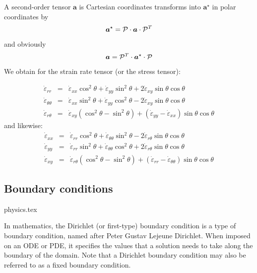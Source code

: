 A second-order tensor ${\bm a}$ is Cartesian coordinates transforms into ${\bm a}^\star$
in polar coordinates by 
\[
{\bm a}^\star = {\cal P} \cdot {\bm a} \cdot {\cal P}^T
\]
and obviously 
\[
{\bm a} = {\cal P}^T \cdot {\bm a}^\star \cdot {\cal P}
\]
We obtain for the strain rate tensor (or the stress tensor):

\begin{eqnarray}
\dot{\varepsilon}_{rr} 
&=& \dot{\varepsilon}_{xx} \cos^2\theta + \dot{\varepsilon}_{yy} \sin^2\theta 
+ 2 \dot{\varepsilon}_{xy} \sin\theta\cos\theta \\
\dot{\varepsilon}_{\theta\theta}
&=& \dot{\varepsilon}_{xx} \sin^2\theta + \dot{\varepsilon}_{yy} \cos^2\theta 
- 2 \dot{\varepsilon}_{xy} \sin\theta\cos\theta \\
\dot{\varepsilon}_{r\theta} 
&=& \dot{\varepsilon}_{xy} (\cos^2\theta-\sin^2\theta) + 
(\dot{\varepsilon}_{yy} - \dot{\varepsilon}_{xx})\sin\theta \cos\theta
\end{eqnarray}
and likewise:
\begin{eqnarray}
\dot{\varepsilon}_{xx} 
&=& \dot{\varepsilon}_{rr} \cos^2\theta + \dot{\varepsilon}_{\theta\theta} \sin^2\theta - 2 \dot{\varepsilon}_{r\theta} \sin\theta\cos\theta \\
\dot{\varepsilon}_{yy}
&=& \dot{\varepsilon}_{rr} \sin^2\theta + \dot{\varepsilon}_{\theta\theta} \cos^2\theta + 2 \dot{\varepsilon}_{r\theta} \sin\theta\cos\theta \\
\dot{\varepsilon}_{xy} 
&=& \dot{\varepsilon}_{r\theta} (\cos^2\theta-\sin^2\theta) + 
(\dot{\varepsilon}_{rr} - \dot{\varepsilon}_{\theta\theta})\sin\theta \cos\theta \label{ss:srboth}
\end{eqnarray}



\newpage
\subsection{Boundary conditions}
\begin{flushright} {\tiny {\color{gray} physics.tex}} \end{flushright}

In mathematics, the Dirichlet (or first-type) 
boundary condition is a type of boundary condition, named after Peter Gustav Lejeune Dirichlet.
When imposed on an ODE or PDE, it specifies the values that a solution needs 
to take along the boundary of the domain.
Note that a Dirichlet boundary condition may also be referred to as a fixed boundary condition. 

